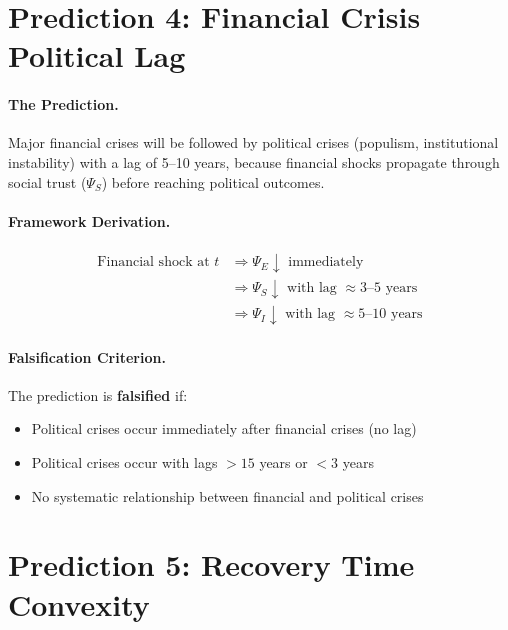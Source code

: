 \section{Prediction 4: Financial Crisis Political Lag}
\label{sec:S-prediction4}

\paragraph{The Prediction.}
Major financial crises will be followed by political crises (populism, institutional instability) with a lag of 5--10 years, because financial shocks propagate through social trust ($\Psi_S$) before reaching political outcomes.

\paragraph{Framework Derivation.}
\begin{align}
    \text{Financial shock at } t &\Rightarrow \Psi_E \downarrow \text{ immediately} \\
    &\Rightarrow \Psi_S \downarrow \text{ with lag } \approx 3\text{--}5 \text{ years} \\
    &\Rightarrow \Psi_I \downarrow \text{ with lag } \approx 5\text{--}10 \text{ years}
\end{align}

\paragraph{Falsification Criterion.}
The prediction is \textbf{falsified} if:
\begin{itemize}
    \item Political crises occur immediately after financial crises (no lag)
    \item Political crises occur with lags $> 15$ years or $< 3$ years
    \item No systematic relationship between financial and political crises
\end{itemize}


\section{Prediction 5: Recovery Time Convexity}
\label{sec:S-prediction5}

